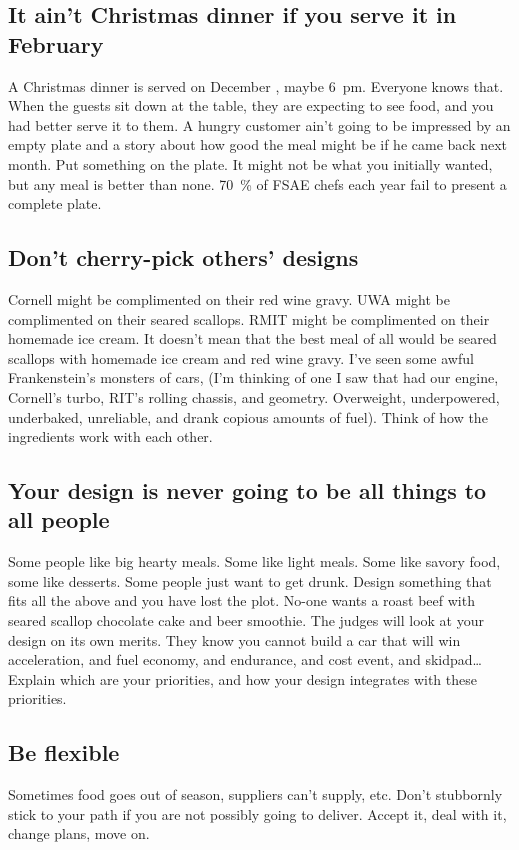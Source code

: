 \documentclass[10pt, a4paper, article, oneside, twocolumn, final]{memoir}
\begin{document}
\subsection*{It ain’t Christmas dinner if you serve it in February}
A Christmas dinner is served on December , maybe \SI{6}{pm}. Everyone knows that. When the guests sit down at the table, they are expecting to see food, and you had better serve it to them. A hungry customer ain’t going to be impressed by an empty plate and a story about how good the meal might be if he came back next month. Put something on the plate. It might not be what you initially wanted, but any meal is better than none. \SI{70}{\percent} of FSAE chefs each year fail to present a complete plate. 

\subsection*{Don’t cherry-pick others’ designs}
Cornell might be complimented on their red wine gravy. UWA might be complimented on their seared scallops. RMIT might be complimented on their homemade ice cream. It doesn’t mean that the best meal of all would be seared scallops with homemade ice cream and red wine gravy. I’ve seen some awful Frankenstein’s monsters of cars, (I’m thinking of one I saw that had our engine, Cornell’s turbo, RIT’s rolling chassis, and geometry. Overweight, underpowered, underbaked, unreliable, and drank copious amounts of fuel). Think of how the ingredients work with each other. 

\subsection*{Your design is never going to be all things to all people}
Some people like big hearty meals. Some like light meals. Some like savory food, some like desserts. Some people just want to get drunk. Design something that fits all the above and you have lost the plot. No-one wants a roast beef with seared scallop chocolate cake and beer smoothie. The judges will look at your design on its own merits. They know you cannot build a car that will win acceleration, and fuel economy, and endurance, and cost event, and skidpad\ldots Explain which are your priorities, and how your design integrates with these priorities. 

\subsection*{Be flexible}
Sometimes food goes out of season, suppliers can’t supply, etc. Don’t stubbornly stick to your path if you are not possibly going to deliver. Accept it, deal with it, change plans, move on. 
\end{document}
